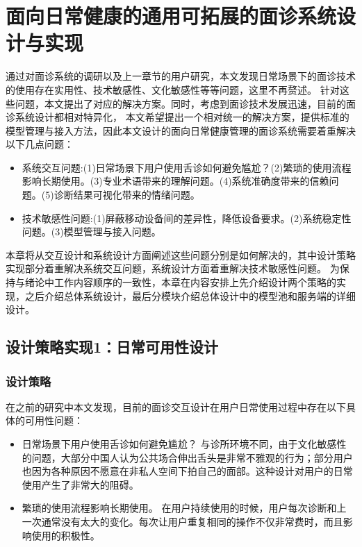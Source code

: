 \chapter{面向日常健康的通用可拓展的面诊系统设计与实现}

通过对面诊系统的调研以及上一章节的用户研究，本文发现日常场景下的面诊技术的使用存在实用性、技术敏感性、文化敏感性等等问题，这里不再赘述。
针对这些问题，本文提出了对应的解决方案。同时，考虑到面诊技术发展迅速，目前的面诊系统设计都相对特异化，
本文希望提出一个相对统一的解决方案，提供标准的模型管理与接入方法，因此本文设计的面向日常健康管理的面诊系统需要着重解决以下几点问题：
\begin{itemize}
    \item 系统交互问题:(1)日常场景下用户使用舌诊如何避免尴尬？(2)繁琐的使用流程影响长期使用。(3)专业术语带来的理解问题。(4)系统准确度带来的信赖问题。(5)诊断结果可视化带来的情绪问题。
    \item 技术敏感性问题:(1)屏蔽移动设备间的差异性，降低设备要求。(2)系统稳定性问题。(3)模型管理与接入问题。
\end{itemize}

本章将从交互设计和系统设计方面阐述这些问题分别是如何解决的，其中设计策略实现部分着重解决系统交互问题，系统设计方面着重解决技术敏感性问题。
为保持与绪论中工作内容顺序的一致性，本章在内容安排上先介绍设计两个策略的实现，之后介绍总体系统设计，最后分模块介绍总体设计中的模型池和服务端的详细设计。

\section{设计策略实现1：日常可用性设计}

\subsection{设计策略}
在之前的研究中本文发现，目前的面诊交互设计在用户日常使用过程中存在以下具体的可用性问题：
\begin{itemize}
    \item 日常场景下用户使用舌诊如何避免尴尬？
    与诊所环境不同，由于文化敏感性的问题，大部分中国人认为公共场合伸出舌头是非常不雅观的行为；部分用户也因为各种原因不愿意在非私人空间下拍自己的面部。这种设计对用户的日常使用产生了非常大的阻碍。
    \item 繁琐的使用流程影响长期使用。
    在用户持续使用的时候，用户每次诊断和上一次通常没有太大的变化。每次让用户重复相同的操作不仅非常费时，而且影响使用的积极性。
\end{itemize}

